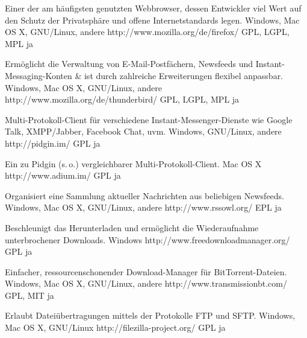 \documentclass[11pt,a4paper,landscape,twocolumn]{article}
\begin{document}


{Einer der am häufigsten genutzten Webbrowser, dessen Entwickler viel Wert auf den Schutz der Privatsphäre und offene Internetstandards legen.}
{Windows, Mac OS X, GNU/Linux, andere}
{http://www.mozilla.org/de/firefox/}
{GPL, LGPL, MPL}
{ja}

{Ermöglicht die Verwaltung von E-Mail-Postfächern, Newsfeeds und Instant-Messaging-Konten \& ist durch zahlreiche Erweiterungen flexibel anpassbar.}
{Windows, Mac OS X, GNU/Linux, andere}
{http://www.mozilla.org/de/thunderbird/}
{GPL, LGPL, MPL}
{ja}

{Multi-Protokoll-Client für verschiedene Instant-Messenger-Dienste wie \mbox{Google} Talk, XMPP/Jabber, Facebook Chat, uvm.}
{Windows, GNU/Linux, andere}
{http://pidgin.im/}
{GPL}
{ja}

{Ein zu Pidgin (s.\,o.) vergleichbarer Multi-Protokoll-Client.}
{Mac OS X}
{http://www.adium.im/}
{GPL}
{ja}


\newpage %


{Organisiert eine Sammlung aktueller Nachrichten aus beliebigen Newsfeeds.}
{Windows, Mac OS X, GNU/Linux, andere}
{http://www.rssowl.org/}
{EPL}
{ja}

\bigskip

{Beschleunigt das Herunterladen und ermöglicht die Wiederaufnahme unterbrochener Downloads.}
{Windows}
{http://www.freedownloadmanager.org/}
{GPL}
{ja}

{Einfacher, ressourcenschonender Download-Manager für BitTorrent-Dateien.}
{Windows, Mac OS X, GNU/Linux, andere}
{http://www.transmissionbt.com/}
{GPL, MIT}
{ja}

{Erlaubt Dateiübertragungen mittels der Protokolle FTP und SFTP.}
{Windows, Mac OS X, GNU/Linux}
{http://filezilla-project.org/}
{GPL}
{ja}
\end{document}
